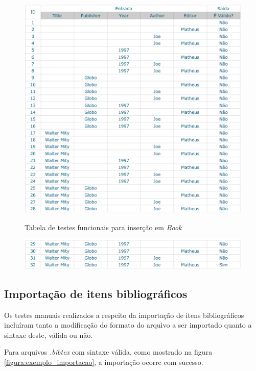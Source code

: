     \begin{figure}[H]
        \caption{Tabela de testes funcionais para inserção em \textit{Book}}
        \vspace{0.5cm}
        \centering
        \includegraphics[width=15cm]{images/tabela_livro_1.png}
        \label{figura:tabela_livro_1}
    \end{figure}

    \begin{figure}[H]
        \centering
        \includegraphics[width=15cm]{images/tabela_livro_2.png}
        \label{figura:tabela_livro_2}
    \end{figure}

    \subsection{Importação de itens bibliográficos}
        Os testes manuais realizados a respeito da importação de itens bibliográficos incluíram tanto a modificação do formato do arquivo a ser importado quanto a sintaxe deste, válida ou não.
        \par Para arquivos \textit{.bibtex} com sintaxe válida, como mostrado na figura \ref{figura:exemplo_importacao}, a importação ocorre com sucesso.
    
